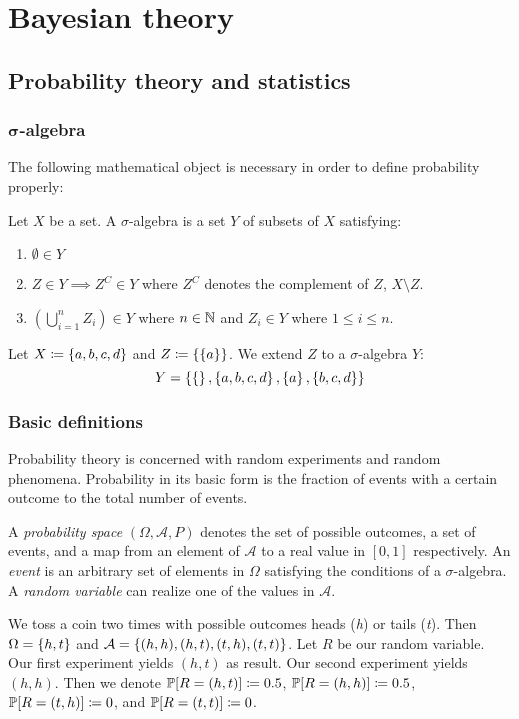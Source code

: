 \chapter{Bayesian theory}
\section{Probability theory and statistics}
\subsection[Sigma-algebra]{$\boldsymbol\sigma$-algebra}
%
The following mathematical object is necessary in order to define probability properly:

\begin{definition}
  Let $X$ be a set. A $\sigma$-algebra is a set $Y$ of subsets of $X$ satisfying:
  \begin{enumerate}
    \item $\emptyset \in Y$
    \item $Z \in Y \implies Z^C \in Y$ where $Z^C$ denotes the complement of $Z$, $X \setminus Z$.
    \item $\left(\bigcup_{i=1}^n Z_i\right) \in Y$ where $n \in \mathbb N$ and $Z_i \in Y$ where $1 \leq i \leq n$.
  \end{enumerate}
\end{definition}
\begin{example}
  Let $X \coloneqq \left\{a, b, c, d\right\}$ and $Z \coloneqq \left\{\left\{a\right\}\right\}$. We extend $Z$ to a $\sigma$-algebra $Y$:
  \[ Y = \left\{\left\{\right\}, \left\{a,b,c,d\right\}, \left\{a\right\}, \left\{b,c,d\right\}\right\} \]
\end{example}

\subsection{Basic definitions}
\label{sec:bp-def}
%
Probability theory is concerned with random experiments and random phenomena. Probability in its basic form is the fraction of events with a certain outcome to the total number of events.
%
\begin{definition}
  A \emph{probability space} $(\Omega, \mathcal A, P)$ denotes
    the set of possible outcomes, a set of events, and a map from an element of $\mathcal A$ to a real value in $[0,1]$ respectively.
  An \emph{event} is an arbitrary set of elements in $\Omega$ satisfying the conditions of a $\sigma$-algebra.
  A \emph{random variable} can realize one of the values in $\mathcal A$.
\end{definition}
\begin{example}
  We toss a coin two times with possible outcomes heads (\textit h) or tails (\textit t). Then $\Omega = \left\{h,t\right\}$ and $\mathcal A = \left\{(h, h), (h, t), (t, h), (t, t)\right\}$.
  Let $R$ be our random variable. Our first experiment yields $(h, t)$ as result. Our second experiment yields $(h, h)$.
  Then we denote $\mathbb P[R=(h,t)] \coloneqq 0.5$, $\mathbb P[R=(h,h)] \coloneqq 0.5$, $\mathbb P[R=(t,h)] \coloneqq 0$, and $\mathbb P[R=(t,t)] \coloneqq 0$.
\end{example}

